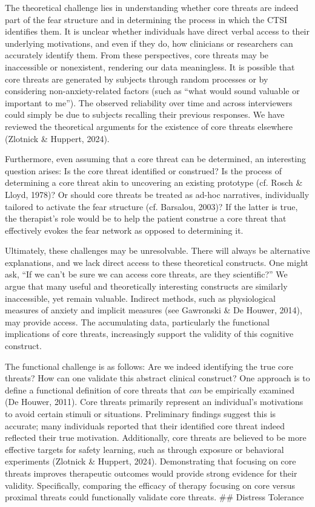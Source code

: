 \documentclass[
  man,floatsintext]{apa7}
\begin{document}
The theoretical challenge lies in understanding whether core threats are indeed part of the fear structure and in determining the process in which the CTSI identifies them.
It is unclear whether individuals have direct verbal access to their underlying motivations, and even if they do, how clinicians or researchers can accurately identify them.
From these perspectives, core threats may be inaccessible or nonexistent, rendering our data meaningless.
It is possible that core threats are generated by subjects through random processes or by considering non-anxiety-related factors (such as ``what would sound valuable or important to me'').
The observed reliability over time and across interviewers could simply be due to subjects recalling their previous responses.
We have reviewed the theoretical arguments for the existence of core threats elsewhere (Zlotnick \& Huppert, 2024).

Furthermore, even assuming that a core threat can be determined, an interesting question arises: Is the core threat identified or construed?
Is the process of determining a core threat akin to uncovering an existing prototype (cf. Rosch \& Lloyd, 1978)?
Or should core threats be treated as ad-hoc narratives, individually tailored to activate the fear structure (cf. Barsalou, 2003)?
If the latter is true, the therapist's role would be to help the patient construe a core threat that effectively evokes the fear network as opposed to determining it.

Ultimately, these challenges may be unresolvable.
There will always be alternative explanations, and we lack direct access to these theoretical constructs.
One might ask, ``If we can't be sure we can access core threats, are they scientific?''
We argue that many useful and theoretically interesting constructs are similarly inaccessible, yet remain valuable.
Indirect methods, such as physiological measures of anxiety and implicit measures (see Gawronski \& De Houwer, 2014), may provide access.
The accumulating data, particularly the functional implications of core threats, increasingly support the validity of this cognitive construct.

The functional challenge is as follows:
Are we indeed identifying the true core threats?
How can one validate this abstract clinical construct?
One approach is to define a functional definition of core threats that \emph{can} be empirically examined (De Houwer, 2011).
Core threats primarily represent an individual's motivations to avoid certain stimuli or situations.
Preliminary findings suggest this is accurate; many individuals reported that their identified core threat indeed reflected their true motivation.
Additionally, core threats are believed to be more effective targets for safety learning, such as through exposure or behavioral experiments (Zlotnick \& Huppert, 2024).
Demonstrating that focusing on core threats improves therapeutic outcomes would provide strong evidence for their validity.
Specifically, comparing the efficacy of therapy focusing on core versus proximal threats could functionally validate core threats.
\#\# Distress Tolerance
\end{document}
